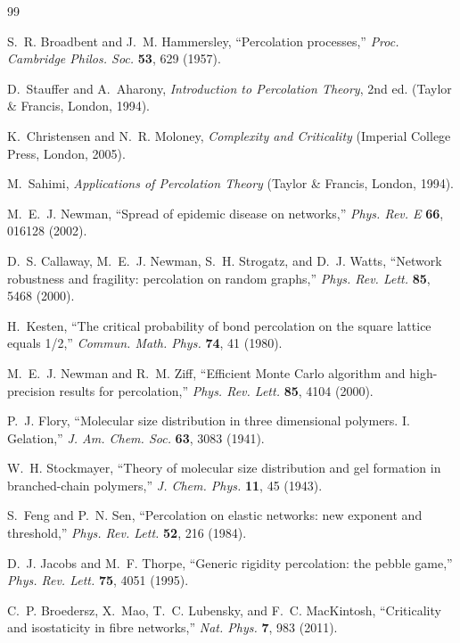 \documentclass[11pt]{article}
\begin{document}
\begin{thebibliography}{99}\small
\setlength{\itemsep}{1pt}

 S.~R. Broadbent and J.~M. Hammersley, ``Percolation processes,'' \emph{Proc. Cambridge Philos. Soc.} \textbf{53}, 629 (1957).

 D.~Stauffer and A.~Aharony, \emph{Introduction to Percolation Theory}, 2nd ed. (Taylor \& Francis, London, 1994).

 K.~Christensen and N.~R. Moloney, \emph{Complexity and Criticality} (Imperial College Press, London, 2005).

 M.~Sahimi, \emph{Applications of Percolation Theory} (Taylor \& Francis, London, 1994).

 M.~E.~J. Newman, ``Spread of epidemic disease on networks,'' \emph{Phys. Rev. E} \textbf{66}, 016128 (2002).

 D.~S. Callaway, M.~E.~J. Newman, S.~H. Strogatz, and D.~J. Watts, ``Network robustness and fragility: percolation on random graphs,'' \emph{Phys. Rev. Lett.} \textbf{85}, 5468 (2000).

 H.~Kesten, ``The critical probability of bond percolation on the square lattice equals 1/2,'' \emph{Commun. Math. Phys.} \textbf{74}, 41 (1980).

 M.~E.~J. Newman and R.~M. Ziff, ``Efficient Monte Carlo algorithm and high-precision results for percolation,'' \emph{Phys. Rev. Lett.} \textbf{85}, 4104 (2000).

 P.~J. Flory, ``Molecular size distribution in three dimensional polymers. I. Gelation,'' \emph{J. Am. Chem. Soc.} \textbf{63}, 3083 (1941).

 W.~H. Stockmayer, ``Theory of molecular size distribution and gel formation in branched-chain polymers,'' \emph{J. Chem. Phys.} \textbf{11}, 45 (1943).

 S.~Feng and P.~N. Sen, ``Percolation on elastic networks: new exponent and threshold,'' \emph{Phys. Rev. Lett.} \textbf{52}, 216 (1984).

 D.~J. Jacobs and M.~F. Thorpe, ``Generic rigidity percolation: the pebble game,'' \emph{Phys. Rev. Lett.} \textbf{75}, 4051 (1995).

 C.~P. Broedersz, X.~Mao, T.~C. Lubensky, and F.~C. MacKintosh, ``Criticality and isostaticity in fibre networks,'' \emph{Nat. Phys.} \textbf{7}, 983 (2011).


\end{thebibliography}
\end{document}
